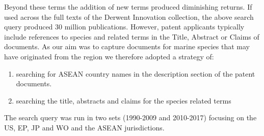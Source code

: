 \documentclass[]{book}
\providecommand{\tightlist}{%
  \setlength{\itemsep}{0pt}\setlength{\parskip}{0pt}}
\theoremstyle{definition}
\theoremstyle{definition}
\theoremstyle{definition}
\theoremstyle{remark}
\begin{document}
Beyond these terms the addition of new terms produced diminishing
returns. If used across the full texts of the Derwent Innovation
collection, the above search query produced 30 million publications.
However, patent applicants typically include references to species and
related terms in the Title, Abstract or Claims of documents. As our aim
was to capture documents for marine species that may have originated
from the region we therefore adopted a strategy of:

\begin{enumerate}
\def\labelenumi{\alph{enumi})}
\tightlist
\item
  searching for ASEAN country names in the description section of the
  patent documents.
\item
  searching the title, abstracts and claims for the species related
  terms
\end{enumerate}

The search query was run in two sets (1990-2009 and 2010-2017) focusing
on the US, EP, JP and WO and the ASEAN jurisdictions.
\end{document}
